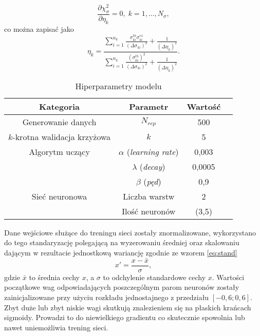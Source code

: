 \documentclass[11pt]{book}
\theoremstyle{definition}
\begin{document}
%
\begin{equation}
\frac{\partial \chi_{\sigma}^2}{\partial \eta_k} = 0, \; k = 1,\dots,N_{\sigma}, \label{eq_eta1}
\end{equation}
co można zapisać jako
%
\begin{equation}
\eta_k = \frac{\sum_{i=1}^{n_k}\frac{\sigma_{ki}^{th} \sigma_{ki}^{ex}}{\left(\Delta \sigma_{ki}\right)^2} + \frac{1}{\left(\Delta \eta_k\right)^2}}{\sum_{i=1}^{n_k}\frac{\left(\sigma_{ki}^{th}\right)^2}{\left(\Delta \sigma_{ki}\right)^2} + \frac{1}{\left(\Delta \eta_k\right)^2}}. \label{eq_eta2}
\end{equation}


\begin{table}
	\centering
	\caption{Hiperparametry modelu}\label{tab:hyper1} 
	\begin{tabular}{c|c c c}
		\hline 
		Kategoria & Parametr & Wartość &   \\\hline
		Generowanie danych & $N_{rep}$ & 500 & \\ \hline
		$k$-krotna walidacja krzyżowa & $k$ & 5 &\\ \hline
		
		Algorytm uczący& $\alpha$ (\textit{learning rate}) & 0,003 & \\
		& $\lambda$ (\textit{decay}) & 0,0005 & \\ 
		& $\beta$ (\textit{pęd}) & 0,9 & \\ \hline
		Sieć neuronowa & Liczba warstw & 2 & \\ 
		& Ilość neuronów & (3,5) & \\ \hline
		
	\end{tabular}
\end{table}

Dane wejściowe służące do treningu sieci zostały znormalizowane, wykorzystano do tego standaryzację polegającą na wyzerowaniu średniej oraz skalowaniu dającym w rezultacie jednostkową wariancję zgodnie ze wzorem \ref{eq:stand}
%
\begin{equation}
x' = \frac{x-\bar{x}}{\sigma} \label{eq:stand},
\end{equation}
%
gdzie $\bar{x}$ to średnia cechy $x$, a $\sigma$ to odchylenie standardowe cechy $x$. Wartości początkowe wag odpowiadających poszczególnym parom neuronów zostały zainicjalizowane przy użyciu rozkładu jednostajnego z przedziału $\left[-0,6; 0,6\right]$. Zbyt duże lub zbyt niskie wagi skutkują znalezieniem się na płaskich krańcach sigmoidy. Prowadzi to do niewielkiego gradientu co skutecznie spowolnia lub nawet uniemożliwia trening sieci.
\end{document}
